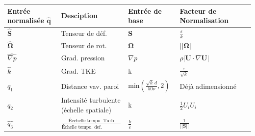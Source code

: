 \documentclass[a4paper,12pt]{report}
\newcommand{\bepar}[1]{
	\left( #1 \right)  
}
\newcommand{\norm}[1]{
	\left \vert \left \vert #1 \right \vert  \right \vert
}
\numberwithin{equation}{section} %
\begin{document}
\begin{table}[!ht]
\centering
	\begin{tabular}{M{0.15\textwidth}| M{.3\textwidth} M{0.18\textwidth} M{0.3\textwidth} N}
	\hline
	Entrée normalisée $\hat{\textbf{q}}$ & Desciption & Entrée de base & Facteur de Normalisation &\\[8mm]\hline
	$\hat{\textbf{S}}$ & Tenseur de déf. & \textbf{S} &$ \displaystyle\frac{\varepsilon}{k}$ &\\[5mm] \hline
	$\hat{\mathbf{\Omega}}$ & Tenseur de rot. & $\mathbf{\Omega}$  &$ \norm{\mathbf{\Omega}}$ &\\[5mm] \hline
	$\widehat{\nabla p}$ & Grad. pression & $\nabla p$  &$ \rho \left \vert \textbf{U} \cdot \nabla \textbf{U} \right \vert$ &\\[5mm] \hline
	$\widehat{k}$ & Grad. TKE & k &$ \displaystyle\frac{\varepsilon}{\sqrt{k}}$ &\\[5mm] \hline
	$q_1$ & Distance vav. paroi & $\displaystyle \text{min}\bepar{\frac{\sqrt{k}\, d}{50 \nu}, 2}$  & Déjà adimensionné &\\[12mm] \hline
	$q_2$ & Intensité turbulente (échelle spatiale) & k &$ \displaystyle\frac{1}{2}U_i U_i$ &\\[12mm] \hline
	$\widehat{q_3}$ & $\displaystyle \frac{\text{Éechelle tempo. Turb}}{\text{Échelle tempo. def. moyenne}}$  & $\displaystyle \frac{k}{\varepsilon}$  &$ \displaystyle \frac{1}{\norm{\textbf{S}}}$ &\\[12mm] \hline
	\end{tabular}
\end{table}

\pagebreak



\end{document}
